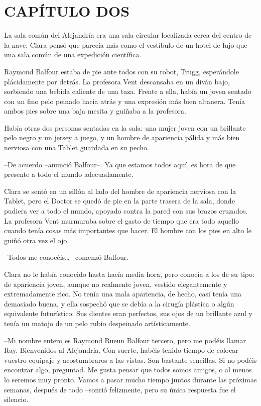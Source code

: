 \chapter*{CAPÍTULO DOS}

{La sala común del Alejandría era una sala circular localizada cerca del
 centro de la nave. Clara pensó que parecía más como el vestíbulo de un
hotel de lujo que una sala común de una expedición científica.}

{Raymond Balfour estaba de pie ante todos con su robot, Trugg,
 esperándole plácidamente por detrás. La profesora Vent descansaba en un
 diván bajo, sorbiendo una bebida caliente de una taza. Frente a ella,
 había un joven sentado con un fino pelo peinado hacia atrás y una
 expresión más bien altanera. Tenía ambos pies sobre una baja mesita y
guiñaba a la profesora.}

{Había otras dos personas sentadas en la sala: una mujer joven con un
 brillante pelo negro y un jersey a juego, y un hombre de apariencia
pálida y más bien nerviosa con una Tablet guardada en su pecho.}

{--De acuerdo --anunció Balfour--. Ya que estamos todos aquí, es hora de
que presente a todo el mundo adecuadamente.}

{Clara se sentó en un sillón al lado del hombre de apariencia nerviosa
 con la Tablet, pero el Doctor se quedó de pie en la parte trasera de la
 sala, donde pudiera ver a todo el mundo, apoyado contra la pared con sus
 brazos cruzados. La profesora Vent murmuraba sobre el gasto de tiempo
 que era todo aquello cuando tenía cosas más importantes que hacer. El
hombre con los pies en alto le guiñó otra vez el ojo.}

{--Todos me conocéis\ldots{} --comenzó Balfour.}

{Clara no le había conocido hasta hacía media hora, pero conocía a los de
 su tipo: de apariencia joven, aunque no realmente joven, vestido
 elegantemente y extremadamente rico. No tenía una mala apariencia, de
 hecho, casi tenía una demasiado buena, y ella sospechó que se debía a la
 cirugía plástica o algún equivalente futurístico. Sus dientes eran
 perfectos, sus ojos de un brillante azul y tenía un matojo de un pelo
rubio despeinado artísticamente.}

{--Mi nombre entero es Raymond Rueun Balfour tercero, pero me podéis
 llamar Ray. Bienvenidos al Alejandría. Con suerte, habéis tenido tiempo
 de colocar vuestro equipaje y acostumbraros a las vistas. Son bastante
 sencillas. Si no podéis encontrar algo, preguntad. Me gusta pensar que
 todos somos amigos, o al menos lo seremos muy pronto. Vamos a pasar
 mucho tiempo juntos durante las próximas semanas, después de todo
--sonrió felizmente, pero su única respuesta fue el silencio.}


